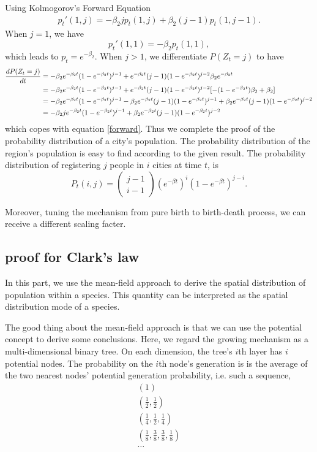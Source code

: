 \documentclass[aps,prl]{revtex4-1}
\begin{document}
Using Kolmogorov’s Forward Equation
\begin{align}p_t'(1,j) = -\beta_2 j p_t(1,j) + \beta_2 (j-1) p_t(1,j-1).\label{forward}\end{align}  When $j = 1$, we have \[p_t'(1,1) = -\beta_2 p_t(1,1), \] which leads to $p_t=e^{-\beta_2}$. When $j>1$, we differentiate $P(Z_t = j)$ to have 
\begin{align}
	\frac{dP(Z_t = j)}{dt} &= -\beta_2e^{-\beta_2 t} (1-e^{-\beta_2 t})^{j-1} + e^{-\beta_2 t}(j-1)(1-e^{-\beta_2 t})^{j-2}\beta_2 e^{-\beta_2 t}\notag\\
	&= -\beta_2 e^{-\beta_2 t}(1-e^{-\beta_2 t})^{j-1} + e^{-\beta_2 t}(j-1)(1-e^{-\beta_2 t})^{j-2} [-(1-e^{-\beta_2 t})\beta_2+\beta_2]\notag\\
	&= -\beta_2 e^{-\beta_2 t}(1-e^{-\beta_2 t})^{j-1} -\beta_2 e^{-\beta_2 t}(j-1)(1-e^{-\beta_2 t})^{j-1} +\beta_2e^{-\beta_2 t}(j-1)(1-e^{-\beta_2 t})^{j-2}\notag\\
	&= -\beta_2 j e^{-\beta_2 t}(1-e^{-\beta_2 t})^{j-1} +\beta_2e^{-\beta_2 t}(j-1)(1-e^{-\beta_2 t})^{j-2}
\end{align}
which copes with equation \ref{forward}. Thus we complete the proof of the probability distribution of a city's population. The probability distribution of the region's population is easy to find according to the given result. The probability distribution of registering $j$ people in $i$ cities at time $t$, is \[ P_t(i,j) = \left(\begin{array}{c}{j-1} \\ {i-1}\end{array}\right)\left(e^{-\beta t}\right)^{i}\left(1-e^{-\beta t}\right)^{j-i}. \]

Moreover, tuning the mechanism from pure birth to birth-death process, we can receive a different scaling facter.

\subsection{proof for Clark's law}

In this part, we use the mean-field approach to derive the spatial distribution of population within a species. This quantity can be interpreted as the spatial distribution mode of a species. 

The good thing about the mean-field approach is that we can use the potential concept to derive some conclusions. Here, we regard the growing mechanism as a multi-dimensional binary tree. On each dimension, the tree's $i$th layer has $i$ potential nodes. The probability on the $i$th node's generation is is the average of the two nearest nodes' potential generation probability, i.e. such a sequence,
\begin{align*}
(1)\\
(\frac{1}{2},\frac{1}{2})\\
(\frac{1}{4},\frac{1}{2},\frac{1}{4})\\
(\frac{1}{8},\frac{3}{8},\frac{3}{8},\frac{1}{8})\\
\dots
\end{align*}
\end{document}
